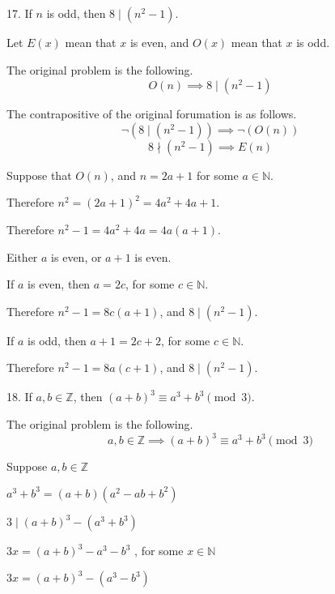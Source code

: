 \documentclass{idrisMemo}
\begin{document}
\begin{prooflist} {17. If $n$ is odd, then $8 \mid (n^2-1)$.}
    \item Let $E(x)$ mean that $x$ is even, and $O(x)$ mean that $x$ is odd.
    \item The original problem is the following.
        $$
        O(n)
        \implies
        8 \mid (n^2-1)
        $$
    \item The contrapositive of the original forumation is as follows.
        $$
        \neg(8 \mid (n^2-1))
        \implies
        \neg(O(n))
        $$
        $$
        8 \nmid (n^2-1)
        \implies
        E(n)
        $$
    \item Suppose that $O(n)$, and $n=2a+1$ for some $a \in \mathbb{N}$.
    \item Therefore $n^2=(2a+1)^2= 4a^2+4a+1$.
    \item Therefore $n^2-1= 4a^2+4a = 4a(a+1)$.
    \item Either $a$ is even, or $a+1$ is even.
    \item If $a$ is even, then $a=2c$, for some $c \in \mathbb{N}$.
    \item Therefore $n^2-1 = 8c(a+1)$, and $8 \mid (n^2-1)$.
    \item If $a$ is odd, then $a+1=2c+2$, for some $c \in \mathbb{N}$.
    \item Therefore $n^2-1 = 8a(c+1)$, and $8 \mid (n^2-1)$.
\end{prooflist}

\begin{prooflist} {18. If $a,b \in \mathbb{Z}$, then $(a+b)^3 \equiv a^3 + b^3 \pmod 3$.}
    \item The original problem is the following.
        $$
            a,b \in \mathbb{Z}
            \implies
            (a+b)^3 \equiv a^3 + b^3 \pmod 3
        $$
    \item Suppose $a,b \in \mathbb{Z}$
    \item $a^3 + b^3 = (a + b)(a^2 - ab + b^2)$
    \item $3 \mid (a+b)^3 - (a^3 + b^3)$
    \item $3x = (a+b)^3 - a^3 - b^3$ , for some $x \in \mathbb{N}$
    \item $3x = (a+b)^3 - (a^3 - b^3)$

\end{prooflist}
\end{document}
